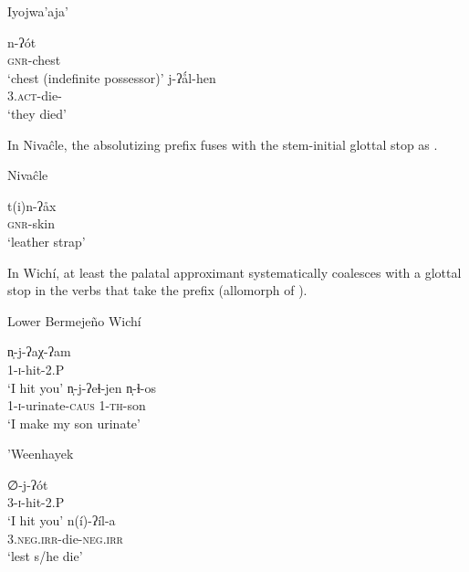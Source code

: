 \newpage
\ea\label{ex:son-plus-glott:ijw}
Iyojwa’aja’ \citep[77--78]{JC14b}\\
\begin{xlist}
        \ex \gll n-ʔót~\\
                \textsc{gnr}-chest\\
                \glt `chest (indefinite possessor)'
        \ex \gll j-ʔǻl-hen~\\
                3.\textsc{act}-die-\PL\\
                \glt `they died'
\end{xlist}
\z

In Nivaĉle, the absolutizing prefix  fuses with the stem-initial glottal stop as .

\ea\label{ex:son-plus-glott:niv}
Nivaĉle \citep[159]{LC20}\\
\begin{xlist}
        \ex \gll t(i)n-ʔåx~\\
                \textsc{gnr}-skin\\
                \glt `leather strap'
\end{xlist}
\z

In Wichí, at least the palatal approximant  systematically coalesces with a glottal stop in the verbs that take the prefix  (allomorph of ).

\ea\label{ex:son-plus-glott:lbw}
Lower Bermejeño Wichí \citep[237--238]{VN14}\\
\begin{xlist}
        \ex \gll n̩-j-ʔaχ-ʔam~\\
                1\SG-\textsc{i}-hit-2\SG.P\\
                \glt `I hit you'
        \ex \gll n̩-j-ʔeɬ-jen n̩-ɬ-os~\\
                1\SG-\textsc{i}-urinate-\textsc{caus} 1\SG-\textsc{th}-son\\
                \glt `I make my son urinate'
\end{xlist}
\z

\ea\label{ex:son-plus-glott:whk}
'Weenhayek \citep[124, 128]{KC16}\\
\begin{xlist}
        \ex \gll ∅-j-ʔót~\\
                3-\textsc{i}-hit-2\SG.P\\
                \glt `I hit you'
        \ex \gll n(í)-ʔíl-a~\\
                3.\textsc{neg.irr}-die-\textsc{neg.irr}\\
                \glt `lest s/he die'
\end{xlist}
\z

